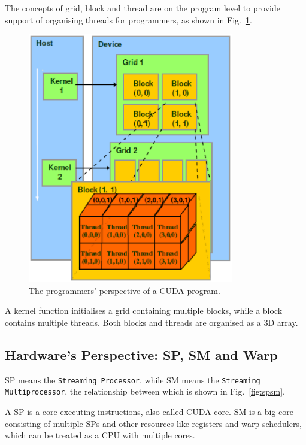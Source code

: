 \documentclass[11pt]{article}
\begin{document}
The concepts of grid, block and thread are on the program level to provide support of organising threads for programmers, as shown in Fig.~\ref{fig:cuda_programmers}. 

\begin{figure}[h]
    \centering
    \includegraphics[width=0.8\textwidth]{cuda_programmers.eps}
    \caption{The programmers' perspective of a CUDA program.}
    \label{fig:cuda_programmers}
\end{figure}

A kernel function initialises a grid containing multiple blocks, while a block contains multiple threads. Both blocks and threads are organised as a 3D array.

\subsection{Hardware's Perspective: SP, SM and Warp}

SP means the \texttt{Streaming Processor}, while SM means the \texttt{Streaming Multiprocessor}, the relationship between which is shown in Fig.~\ref{fig:spsm}.

A SP is a core executing instructions, also called CUDA core. SM is a big core consisting of multiple SPs and other resources like registers and warp schedulers, which can be treated as a CPU with multiple cores.
\end{document}
